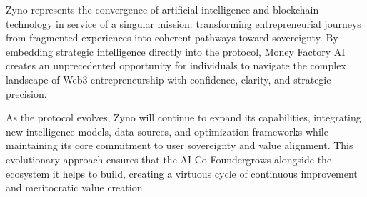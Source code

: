 Zyno represents the convergence of artificial intelligence and blockchain technology in service of a singular mission: transforming entrepreneurial journeys from fragmented experiences into coherent pathways toward sovereignty. By embedding strategic intelligence directly into the protocol, Money Factory AI creates an unprecedented opportunity for individuals to navigate the complex landscape of Web3 entrepreneurship with confidence, clarity, and strategic precision.

As the protocol evolves, Zyno will continue to expand its capabilities, integrating new intelligence models, data sources, and optimization frameworks while maintaining its core commitment to user sovereignty and value alignment. This evolutionary approach ensures that the AI Co-Founder\texttrademark grows alongside the ecosystem it helps to build, creating a virtuous cycle of continuous improvement and meritocratic value creation.

\newpage

